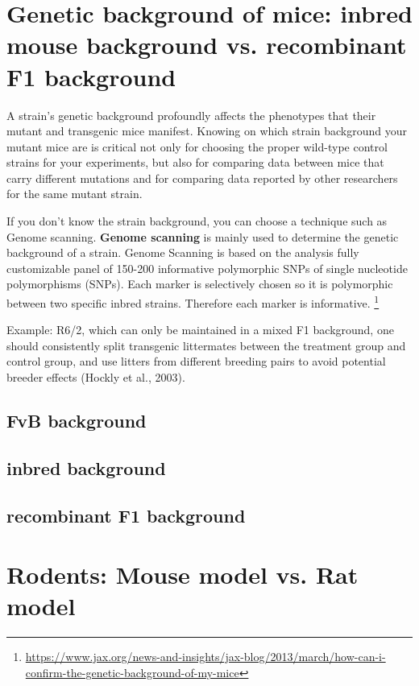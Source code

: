 \section{Genetic background of mice: inbred mouse background vs. recombinant F1
 background}
 
A strain's genetic background profoundly affects the phenotypes that their
mutant and transgenic mice manifest.
Knowing on which strain background your mutant mice are is critical not only for
choosing the proper wild-type control strains for your experiments, but also for
comparing data between mice that carry different mutations and for comparing
data reported by other researchers for the same mutant strain.

If you don't know the strain background, you can choose a technique such as
Genome scanning. {\bf Genome scanning} is mainly used to determine the genetic
background of a strain.
Genome Scanning is based on the analysis fully customizable panel of 150-200
informative polymorphic SNPs of single nucleotide polymorphisms (SNPs). Each
marker is selectively chosen so it is polymorphic between two specific inbred
strains. Therefore each marker is informative.
\footnote{\url{https://www.jax.org/news-and-insights/jax-blog/2013/march/how-can-i-confirm-the-genetic-background-of-my-mice}}


Example: R6/2, which can only be maintained in a mixed F1 background, one should
consistently split transgenic littermates between the treatment group and
control group, and use litters from different breeding pairs to avoid potential
breeder effects (Hockly et al., 2003).


\subsection{FvB background}

\subsection{inbred background}

\subsection{recombinant F1 background}




 
 
\section{Rodents: Mouse model vs. Rat model}

